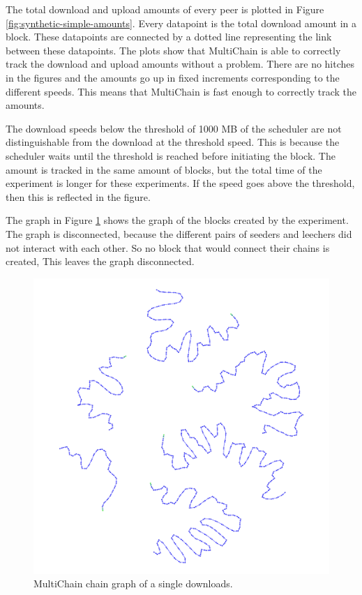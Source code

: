 The total download and upload amounts of every peer is plotted in Figure \ref{fig:synthetic-simple-amounts}.
Every datapoint is the total download amount in a block.
These datapoints are connected by a dotted line representing the link between these datapoints.
The plots show that MultiChain is able to correctly track the download and upload amounts without a problem.
There are no hitches in the figures and the amounts go up in fixed increments corresponding to the different speeds.
This means that MultiChain is fast enough to correctly track the amounts.

The download speeds below the threshold of 1000 MB of the scheduler
are not distinguishable from the download at the threshold speed.
This is because the scheduler waits until the threshold is reached before initiating the block.
The amount is tracked in the same amount of blocks,
but the total time of the experiment is longer for these experiments.
If the speed goes above the threshold, then this is reflected in the figure.

The graph in Figure \ref{fig:synthetic-simple-graph} shows the graph of the blocks created by the experiment.
The graph is disconnected, because the different pairs of seeders and leechers did not interact with each other.
So no block that would connect their chains is created,
This leaves the graph disconnected.

\begin{figure}
	\centerline{\includegraphics[scale=0.06]{experimentation/synthetic/simple/synthetic.png}}
	\caption{MultiChain chain graph of a single downloads.}
	\label{fig:synthetic-simple-graph}
\end{figure}

